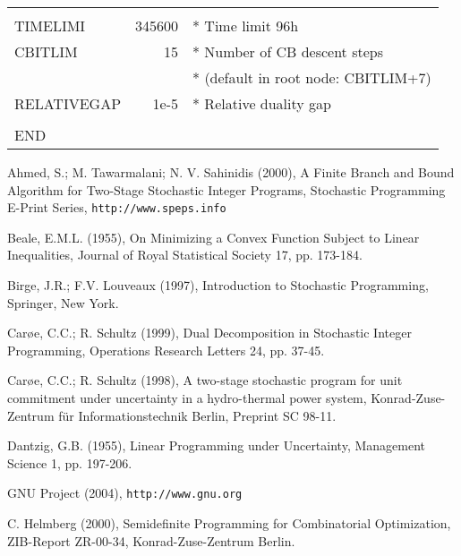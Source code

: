 \documentclass[11pt,draft]{article}
\newcommand{\+}{{\ti{+}}}
\newcommand{\1}{{\ti{1}}}
\newcommand{\etal}{et al.\/}
\begin{document}
\begin{appendix}
\begin{center}
{\begin{tabular}{lrl}
&&\\
TIMELIMI &  345600 & * Time limit 96h\\
CBITLIM       & 15 & * Number of CB descent steps\\
              &    & * {\small (default in root node: CBITLIM+7)}\\
RELATIVEGAP & 1e-5 & * Relative duality gap\\
&&\\
END&&\\
\end{tabular}}
\end{center}
\vspace{2ex}
\end{appendix}



\begin{thebibliography}{99}

\bibitem[Ahmed \etal(2000)]{ahme} Ahmed, S.; M. Tawarmalani; N. V. Sahinidis (2000), A Finite Branch and 
Bound Algorithm for Two-Stage Stochastic Integer Programs, Stochastic Programming E-Print Series,
\texttt{http://www.speps.info} 

 Beale, E.M.L. (1955), On Minimizing a Convex Function Subject to Linear
Inequalities, Journal of Royal Statistical Society 17, pp. 173-184.

 Birge, J.R.; F.V. Louveaux (1997), Introduction to
Stochastic Programming, Springer, 
    New York.

    Car\o e, C.C.; R. Schultz (1999),         
        Dual Decomposition in Sto\-chastic Integer Programming, 
        Operations Research Letters 24, pp. 37-45.

 Car\o e, C.C.; R. Schultz (1998), A two-stage stochastic program
for unit commitment under uncertainty in a hydro-thermal power system, 
Konrad-Zuse-Zentrum f\"ur Informationstechnik Berlin, Preprint SC 98-11. 

 Dantzig, G.B. (1955), Linear Programming under Uncertainty,
Management Science 1, pp. 197-206.

 GNU Project (2004), \texttt{http://www.gnu.org}

 C. Helmberg (2000), Semidefinite Programming for Combinatorial
Optimization, ZIB-Report ZR-00-34, Konrad-Zuse-Zentrum Berlin.


\end{thebibliography}
\end{document}
